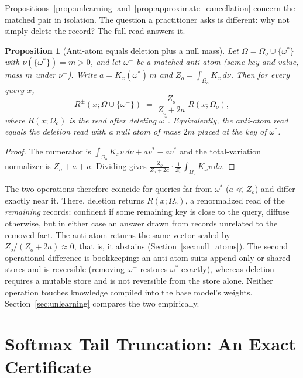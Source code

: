 \documentclass[preprint,12pt]{elsarticle}
\newtheorem{proposition}{Proposition}
\newcommand{\Om}{\Omega}
\newif\ifmarkchanges %
\newcommand{\rev}[1]{\ifmarkchanges{\color{blue}#1}\else#1\fi} %
\providecommand{\DIFaddbegin}{} %
\providecommand{\DIFaddend}{} %
\providecommand{\DIFaddincludegraphics}[2][]{{\color{blue}\fbox{\DIFOincludegraphics[#1]{#2}}}} %
\DeclareRobustCommand{\DIFaddbegin}{\DIFOaddbegin \let\includegraphics\DIFaddincludegraphics} %
\DeclareRobustCommand{\DIFaddend}{\DIFOaddend \let\includegraphics\DIFOincludegraphics} %
\begin{document}
\DIFaddbegin \rev{Propositions~\ref{prop:unlearning} and~\ref{prop:approximate_cancellation} concern the matched pair in isolation. The question a practitioner asks is different: why not simply delete the record? The full read answers it.}

\begin{proposition}[Anti-atom equals deletion plus a null mass]
\label{prop:anti_vs_delete}
\rev{Let $\Om=\Om_o\cup\{\omega^*\}$ with $\nu(\{\omega^*\})=m>0$, and let $\omega^-$ be a matched anti-atom (same key and value, mass $m$ under $\nu^-$). Write $a=K_x(\omega^*)\,m$ and $Z_o=\int_{\Om_o}K_x\,d\nu$. Then for every query $x$,
\[
  R^{\pm}(x;\Om\cup\{\omega^-\}) \;=\; \frac{Z_o}{Z_o+2a}\;R(x;\Om_o),
\]
where $R(x;\Om_o)$ is the read after deleting $\omega^*$. Equivalently, the anti-atom read equals the deletion read with a null atom of mass $2m$ placed at the key of $\omega^*$.}
\end{proposition}

\begin{proof}
\rev{The numerator is $\int_{\Om_o}K_x v\,d\nu+a v^*-a v^*$ and the total-variation normalizer is $Z_o+a+a$. Dividing gives $\frac{Z_o}{Z_o+2a}\cdot\frac{1}{Z_o}\int_{\Om_o}K_x v\,d\nu$.} \qedhere
\end{proof}

\rev{The two operations therefore coincide for queries far from $\omega^*$ ($a\ll Z_o$) and differ exactly near it. There, deletion returns $R(x;\Om_o)$, a renormalized read of the \emph{remaining} records: confident if some remaining key is close to the query, diffuse otherwise, but in either case an answer drawn from records unrelated to the removed fact. The anti-atom returns the same vector scaled by $Z_o/(Z_o+2a)\approx0$, that is, it abstains (Section~\ref{sec:null_atoms}). The second operational difference is bookkeeping: an anti-atom suits append-only or shared stores and is reversible (removing $\omega^-$ restores $\omega^*$ exactly), whereas deletion requires a mutable store and is not reversible from the store alone. Neither operation touches knowledge compiled into the base model's weights. Section~\ref{sec:unlearning} compares the two empirically.}

\DIFaddend \section{Softmax Tail Truncation: An Exact Certificate}
\label{sec:quadrature}
\end{document}
